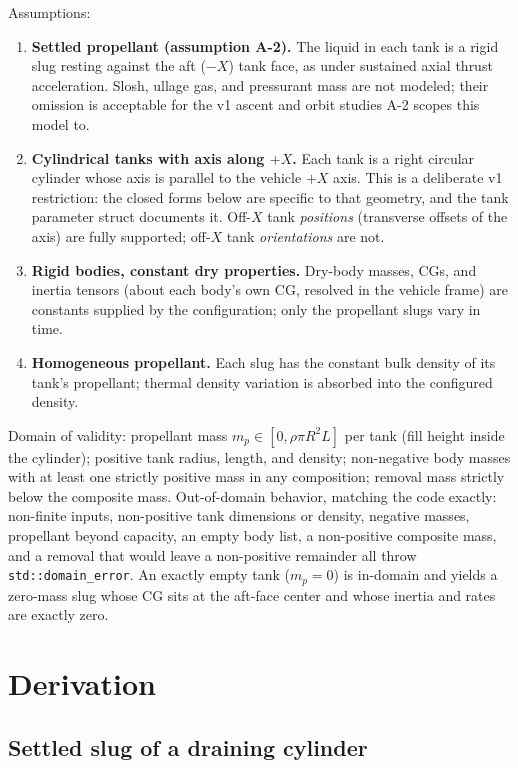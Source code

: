 Assumptions:
\begin{enumerate}
  \item \textbf{Settled propellant (assumption A-2).} The liquid in each
    tank is a rigid slug resting against the aft ($-X$) tank face, as
    under sustained axial thrust acceleration. Slosh, ullage gas, and
    pressurant mass are not modeled; their omission is acceptable for the
    v1 ascent and orbit studies A-2 scopes this model to.
  \item \textbf{Cylindrical tanks with axis along $+X$.} Each tank is a
    right circular cylinder whose axis is parallel to the vehicle $+X$
    axis. This is a deliberate v1 restriction: the closed forms below are
    specific to that geometry, and the tank parameter struct documents
    it. Off-$X$ tank \emph{positions} (transverse offsets of the axis)
    are fully supported; off-$X$ tank \emph{orientations} are not.
  \item \textbf{Rigid bodies, constant dry properties.} Dry-body masses,
    CGs, and inertia tensors (about each body's own CG, resolved in the
    vehicle frame) are constants supplied by the configuration; only the
    propellant slugs vary in time.
  \item \textbf{Homogeneous propellant.} Each slug has the constant bulk
    density of its tank's propellant; thermal density variation is
    absorbed into the configured density.
\end{enumerate}

Domain of validity: propellant mass $m_p \in [0, \rho \pi R^2 L]$ per
tank (fill height inside the cylinder); positive tank radius, length,
and density; non-negative body masses with at least one strictly
positive mass in any composition; removal mass strictly below the
composite mass. Out-of-domain behavior, matching the code exactly:
non-finite inputs, non-positive tank dimensions or density, negative
masses, propellant beyond capacity, an empty body list, a non-positive
composite mass, and a removal that would leave a non-positive remainder
all throw \texttt{std::domain\_error}. An exactly empty tank
($m_p = 0$) is in-domain and yields a zero-mass slug whose CG sits at
the aft-face center and whose inertia and rates are exactly zero.

\section{Derivation}
\label{sec:massprops:derivation}

\subsection{Settled slug of a draining cylinder}

